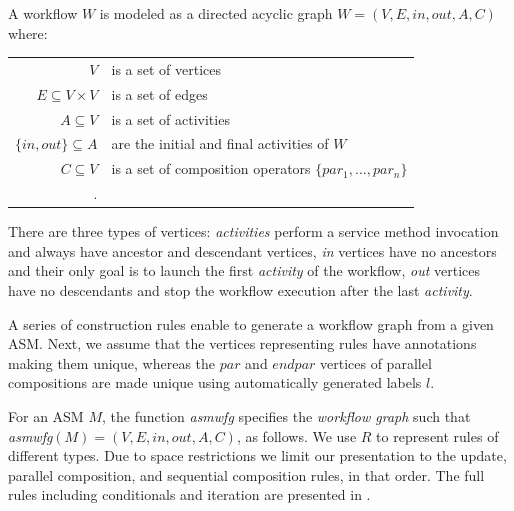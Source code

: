 A workflow $W$ is modeled as a directed acyclic graph $W=(V, E, in, out, A, C)$ where:
		\begin{center}
			\footnotesize
			\begin{tabular}{rp{7.5cm}}
				$V$                      & is a set of vertices \\
				$E \subseteq V \times V$ & is a set of edges \\
				$A \subseteq V$          & is a set of activities \\
				$\{in, out\} \subseteq A$     & are the initial and final activities of $W$\\
				$C \subseteq V$          & is a set of composition operators $\{par_1,...,par_n\}$\\.     
			\end{tabular}   
		\end{center}
There are three types of vertices: \textit{activities} perform a service method invocation and always have ancestor and descendant vertices, \textit{in} vertices have no ancestors and their only goal is to launch the first \textit{activity} of the workflow, \textit{out} vertices have no descendants and stop the workflow execution after the last \textit{activity}.

A series of construction rules enable to generate a workflow graph from a given ASM. Next, we assume that the vertices representing rules have annotations making them unique, whereas the $par$ and $endpar$ vertices of parallel compositions are made unique using automatically generated labels $l$.

For an ASM $M$, the function \textit{asmwfg} specifies the \textit{workflow graph} such that \textit{asmwfg}$(M) = (V, E, in, out, A, C)$, as follows. We use $R$ to represent rules of different types. Due to space restrictions we limit our presentation to the update, parallel composition, and sequential composition rules, in that order. The full rules including conditionals and iteration are presented in \cite{vcv}.

